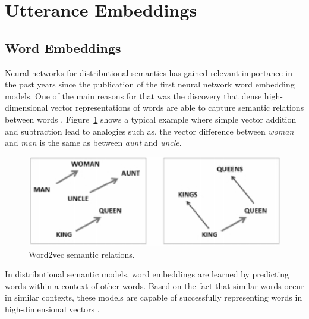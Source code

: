 \section{Utterance Embeddings}\label{sec:utt2vec}

\subsection{Word Embeddings}
Neural networks for distributional semantics has gained relevant importance in the past years since the publication of the first neural network word embedding models. One of the main reasons for that was the discovery that dense high-dimensional vector representations of words are able to capture semantic relations between words .  Figure~\ref{fig:w2v_example} shows a typical example where simple vector addition and subtraction lead to analogies such as, the vector difference between \textit{woman} and \textit{man} is the same as between \textit{aunt} and \textit{uncle}.


\begin{figure}
\centering
\begin{minipage}{.4\textwidth}
\includegraphics[width=1\textwidth]{img/w2v_example}
\caption{Word2vec semantic relations.}
\label{fig:w2v_example}
\end{minipage}
\end{figure}

In distributional semantic models, word embeddings are learned by predicting words within a context of other words. Based on the fact that similar words occur in similar contexts, these models are capable of successfully representing words in high-dimensional vectors . 

